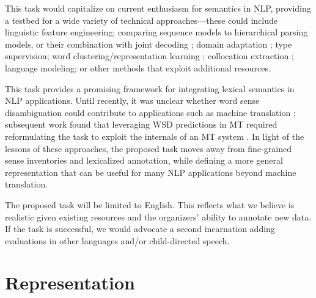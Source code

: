 \documentclass[11pt]{article}
\begin{document}
This task would capitalize on current enthusiasm for semantics in NLP, 
providing a testbed for a wide variety of technical approaches---these could include 
linguistic feature engineering; comparing sequence models to hierarchical parsing models, or their combination 
with joint decoding \citep{le_roux-14}; domain adaptation \citep{johannsen-14}; 
type supervision; word clustering\slash representation learning \citep{grave-13}; 
collocation extraction \citep{pecina-10,ramisch-12}; 
language modeling; or other methods that exploit additional resources.

This task provides a promising framework for integrating lexical semantics in NLP applications. 
Until recently, it was unclear whether word sense disambiguation could contribute to applications 
such as machine translation \citep{carpuat-05,resnik-06}; 
subsequent work found that leveraging WSD predictions in MT required 
reformulating the task to exploit the internals of an MT system
\citep{chan-07,carpuat-07,lefever-10}. 
In light of the lessons of these approaches, the proposed task moves away 
from fine-grained sense inventories and lexicalized annotation, 
while defining a more general representation that can be useful 
for many NLP applications beyond machine translation.


The proposed task will be limited to English. 
This reflects what we believe is realistic given existing resources 
and the organizers' ability to annotate new data. 
If the task is successful, we would advocate a second incarnation 
adding evaluations in other languages and/or child-directed speech.

\section{Representation}
\end{document}
